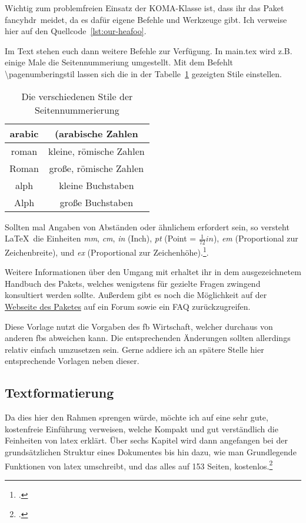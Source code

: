Wichtig zum problemfreien Einsatz der KOMA-Klasse ist, dass ihr das Paket \glqq fancyhdr\grqq\ meidet, da es dafür eigene Befehle und Werkzeuge gibt. Ich verweise hier auf den Quellcode~\ref{lst:our-heafoo}.



Im Text stehen euch dann weitere Befehle zur Verfügung. In main.tex wird z.B. einige Male die Seitennummeriung umgestellt. Mit dem Befehlt \textbackslash pagenumberingstil lassen sich die in der Tabelle~\ref{tab:pgnumb} gezeigten Stile einstellen.

\begin{table}[htpb]
  \centering
  \begin{tabular}{|c|c|}
    \hline
    arabic & (arabische Zahlen \\ \hline
    roman & kleine, römische Zahlen \\ \hline
    Roman & große, römische Zahlen \\ \hline
    alph & kleine Buchstaben \\ \hline
    Alph & große Buchstaben \\ \hline
  \end{tabular}
  \caption{Die verschiedenen Stile der Seitennummerierung}
  \label{tab:pgnumb}
\end{table}

Sollten mal Angaben von Abständen oder ähnlichem erfordert sein, so versteht \LaTeX{}\ die Einheiten \emph{mm}, \emph{cm}, \emph{in} (Inch), \emph{pt} (Point = $\frac{1}{72} in$), \emph{em} (Proportional zur Zeichenbreite), und \emph{ex} (Proportional zur Zeichenhöhe).\footcite[Vgl. ][S. 5]{riedel_latex_2011}.

Weitere Informationen über den Umgang mit  erhaltet ihr in dem ausgezeichnetem Handbuch des Pakets, welches wenigstens für gezielte Fragen zwingend konsultiert werden sollte. Außerdem gibt es noch die Möglichkeit auf der \href{https://komascript.de/}{Webseite des Paketes} auf ein Forum sowie ein FAQ zurückzugreifen.

Diese Vorlage nutzt die Vorgaben des \gls{fb} Wirtschaft, welcher durchaus von anderen \glspl{fb} abweichen kann. Die entsprechenden Änderungen sollten allerdings relativ einfach umzusetzen sein. Gerne addiere ich an spätere Stelle hier entsprechende Vorlagen neben dieser.%
\subsection{Textformatierung}%
\label{sec:textformat}
Da dies hier den Rahmen sprengen würde, möchte ich auf eine sehr gute, kostenfreie Einführung verweisen, welche Kompakt und gut verständlich die Feinheiten von \gls{latex} erklärt. Über sechs Kapitel wird dann angefangen bei der grundsätzlichen Struktur eines Dokumentes bis hin dazu, wie man Grundlegende Funktionen von \gls{latex} umschreibt, und das alles auf 153 Seiten, kostenlos.\footcite{oetiker_not_2018}

